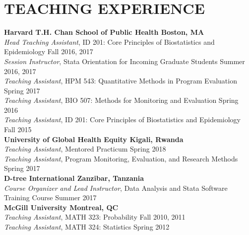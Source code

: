 \documentclass[12pt]{article}
\begin{document}
\section*{\textbf{{\large T}{EACHING} {\large E}{XPERIENCE}}}
\textbf{Harvard T.H. Chan School of Public Health \hfill \hfill Boston, MA} \\
\textit{Head Teaching Assistant}, ID 201: Core Principles of Biostatistics and Epidemiology \hfill \hfill Fall 2016, 2017 \\
\textit{Session Instructor}, Stata Orientation for Incoming Graduate Students \hfill \hfill	Summer 2016, 2017 \\
\textit{Teaching Assistant}, HPM 543: Quantitative Methods in Program Evaluation \hfill \hfill Spring 2017 \\
\textit{Teaching Assistant}, BIO 507: Methods for Monitoring and Evaluation \hfill \hfill Spring 2016 \\
\textit{Teaching Assistant}, ID 201: Core Principles of Biostatistics and Epidemiology \hfill \hfill Fall 2015 \\

\textbf{University of Global Health Equity \hfill \hfill Kigali, Rwanda} \\
\textit{Teaching Assistant}, Mentored Practicum \hfill \hfill Spring 2018  \\
\textit{Teaching Assistant}, Program Monitoring, Evaluation, and Research Methods  \hfill \hfill Spring 2017 \\

\textbf{D-tree International \hfill \hfill Zanzibar, Tanzania}\\
\textit{Course Organizer and Lead Instructor}, Data Analysis and Stata Software Training Course \hfill \hfill Summer 2017  \\

\textbf{McGill University \hfill \hfill Montreal, QC}\\
\textit{Teaching Assistant}, MATH 323: Probability \hfill \hfill Fall 2010, 2011 \\
\textit{Teaching Assistant}, MATH 324: Statistics \hfill \hfill Spring 2012 

\end{document}
